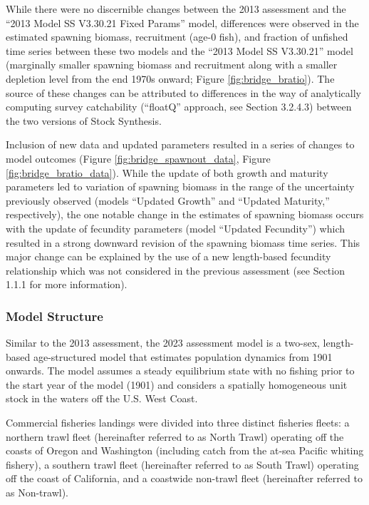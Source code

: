 \documentclass[11pt,
  english,
  letterpaper,
]{article}
\begin{document}
While there were no discernible changes between the 2013 assessment and the ``2013 Model SS V3.30.21 Fixed Params'' model, differences were observed in the estimated spawning biomass, recruitment (age-0 fish), and fraction of unfished time series between these two models and the ``2013 Model SS V3.30.21'' model (marginally smaller spawning biomass and recruitment along with a smaller depletion level from the end 1970s onward; Figure \ref{fig:bridge_bratio}). The source of these changes can be attributed to differences in the way of analytically computing survey catchability (``floatQ'' approach, see Section 3.2.4.3) between the two versions of Stock Synthesis.

Inclusion of new data and updated parameters resulted in a series of changes to model outcomes (Figure \ref{fig:bridge_spawnout_data}, Figure \ref{fig:bridge_bratio_data}). While the update of both growth and maturity parameters led to variation of spawning biomass in the range of the uncertainty previously observed (models ``Updated Growth'' and ``Updated Maturity,'' respectively), the one notable change in the estimates of spawning biomass occurs with the update of fecundity parameters (model ``Updated Fecundity'') which resulted in a strong downward revision of the spawning biomass time series. This major change can be explained by the use of a new length-based fecundity relationship which was not considered in the previous assessment (see Section 1.1.1 for more information).

\hypertarget{model-structure}{%
\subsubsection{Model Structure}\label{model-structure}}

Similar to the 2013 assessment, the 2023 assessment model is a two-sex, length-based age-structured model that estimates population dynamics from 1901 onwards. The model assumes a steady equilibrium state with no fishing prior to the start year of the model (1901) and considers a spatially homogeneous unit stock in the waters off the U.S. West Coast.

Commercial fisheries landings were divided into three distinct fisheries fleets: a northern trawl fleet (hereinafter referred to as North Trawl) operating off the coasts of Oregon and Washington (including catch from the at-sea Pacific whiting fishery), a southern trawl fleet (hereinafter referred to as South Trawl) operating off the coast of California, and a coastwide non-trawl fleet (hereinafter referred to as Non-trawl).
\end{document}
